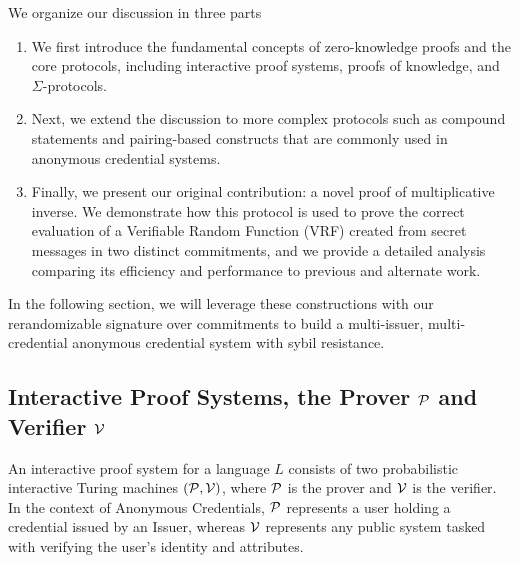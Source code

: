 We organize our discussion in three parts
\begin{enumerate}
    \item We first introduce the fundamental concepts of zero-knowledge proofs and the core protocols, including interactive proof systems, proofs of knowledge, and $\Sigma$-protocols.
    \item Next, we extend the discussion to more complex protocols such as compound statements and pairing-based constructs that are commonly used in anonymous credential systems.
    \item Finally, we present our original contribution: a novel proof of multiplicative inverse. We demonstrate how this protocol is used to prove the correct evaluation of a Verifiable Random Function (VRF) created from secret messages in two distinct commitments, and we provide a detailed analysis comparing its efficiency and performance to previous and alternate work.
\end{enumerate}
In the following section, we will leverage these constructions with our rerandomizable signature over commitments to build a multi-issuer, multi-credential anonymous credential system with sybil resistance.
















\subsection{Interactive Proof Systems, the Prover $\mathcal{P}$ and Verifier $\mathcal{V}$}

An interactive proof system for a language $L$ consists of two probabilistic interactive Turing machines $(\mathcal{P}, \mathcal{V})$, where $\mathcal{P}$ is the prover and $\mathcal{V}$ is the verifier. In the context of Anonymous Credentials, $\mathcal{P}$ represents a user holding a credential issued by an Issuer, whereas $\mathcal{V}$ represents any public system tasked with verifying the user's identity and attributes.

